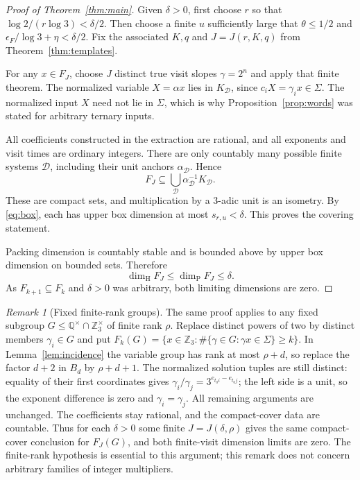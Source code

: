 \documentclass[11pt]{article}
\theoremstyle{definition}
\theoremstyle{remark}
\newtheorem{remark}[theorem]{Remark}
\newcommand{\Z}{\mathbb Z}
\newcommand{\Q}{\mathbb Q}
\newcommand{\dimH}{\dim_{\mathrm H}}
\newcommand{\dimP}{\dim_{\mathrm P}}
\begin{document}
\begin{proof}[Proof of Theorem~\ref{thm:main}]
Given $\delta>0$, first choose $r$ so that
$\log2/(r\log3)<\delta/2$. Then choose a finite $u$ sufficiently
large that $\theta\le1/2$ and
$\epsilon_F/\log3+\eta<\delta/2$. Fix the associated $K,q$ and
$J=J(r,K,q)$ from Theorem~\ref{thm:templates}.

For any $x\in F_J$, choose $J$ distinct true visit slopes
$\gamma=2^n$ and apply that finite theorem. The normalized variable
$X=\alpha x$ lies in $K_{\mathcal D}$, since
$c_iX=\gamma_i x\in\Sigma$. The normalized input $X$ need not lie
in $\Sigma$, which is why Proposition~\ref{prop:words} was stated
for arbitrary ternary inputs.

All coefficients constructed in the extraction are rational, and all
exponents and visit times are ordinary integers. There are only
countably many possible finite systems $\mathcal D$, including their
unit anchors $\alpha_{\mathcal D}$. Hence
\[
 F_J\subseteq\bigcup_{\mathcal D}
 \alpha_{\mathcal D}^{-1}K_{\mathcal D}.
\]
These are compact sets, and multiplication by a $3$-adic unit is an
isometry. By \eqref{eq:box}, each has upper box dimension at most
$s_{r,u}<\delta$. This proves the covering statement.

Packing dimension is countably stable and is bounded above by upper
box dimension on bounded sets. Therefore
\[
 \dimH F_J\le\dimP F_J\le\delta.
\]
As $F_{k+1}\subseteq F_k$ and $\delta>0$ was arbitrary, both limiting
dimensions are zero.
\end{proof}

\begin{remark}[Fixed finite-rank groups]
The same proof applies to any fixed subgroup
$G\le\Q^\times\cap\Z_3^\times$ of finite rank $\rho$. Replace
distinct powers of two by distinct members $\gamma_i\in G$ and put
$F_k(G)=\{x\in\Z_3:\#\{\gamma\in G:\gamma x\in\Sigma\}\ge k\}$.
In Lemma~\ref{lem:incidence} the variable group has rank at most
$\rho+d$, so replace the factor $d+2$ in $B_d$ by $\rho+d+1$.
The normalized solution tuples are still distinct: equality of their
first coordinates gives $\gamma_i/\gamma_j=3^{e_{t_0i}-e_{t_0j}}$;
the left side is a unit, so the exponent difference is zero and
$\gamma_i=\gamma_j$. All remaining arguments are unchanged.
The coefficients stay rational, and the compact-cover data are
countable. Thus for each $\delta>0$ some finite
$J=J(\delta,\rho)$ gives the same compact-cover conclusion for
$F_J(G)$, and both finite-visit dimension limits are zero.
The finite-rank hypothesis is essential to this argument; this remark
does not concern arbitrary families of integer multipliers.
\end{remark}
\end{document}
